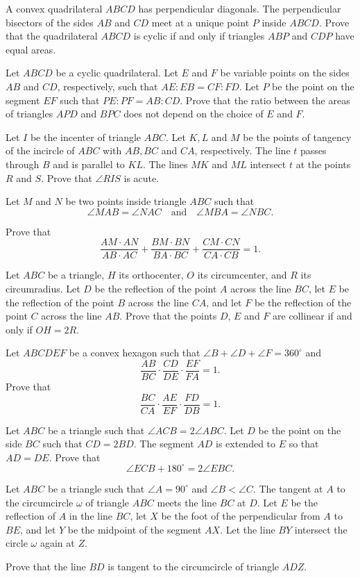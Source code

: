 \item[\textbf{G1.}]A convex quadrilateral $ABCD$ has perpendicular diagonals. The perpendicular bisectors of the sides $AB$ and $CD$ meet at a unique point $P$ inside $ABCD$. Prove that the quadrilateral $ABCD$ is cyclic if and only if triangles $ABP$ and $CDP$ have equal areas.

\item[\textbf{G2.}]Let $ABCD$ be a cyclic quadrilateral. Let $E$ and $F$ be variable points on the sides $AB$ and $CD$,  respectively, such that $AE:EB=CF:FD$. Let $P$ be the point on the segment $EF$ such that $PE:PF=AB:CD$. Prove that the ratio between the areas of triangles $APD$ and $BPC$ does not depend on the choice of $E$ and $F$.

\item[\textbf{G3.}]Let $I$ be the incenter of triangle $ABC$. Let $K,L$ and $M$ be the points of tangency of the incircle of $ABC$ with $AB,BC$ and $CA$,  respectively. The line $t$ passes through $B$ and is parallel to $KL$. The lines $MK$ and $ML$ intersect $t$ at the points $R$ and $S$. Prove that $\angle RIS$ is acute.

\item[\textbf{G4.}]Let $ M$ and $ N$ be two points inside triangle $ ABC$ such that\[ \angle MAB = \angle NAC\quad \mbox{and}\quad \angle MBA = \angle NBC.
\]

Prove that\[ \frac {AM \cdot AN}{AB \cdot AC} + \frac {BM \cdot BN}{BA \cdot BC} + \frac {CM \cdot CN}{CA \cdot CB} = 1.
\]

\item[\textbf{G5.}]Let $ABC$ be a triangle, $H$ its orthocenter, $O$ its circumcenter, and $R$ its circumradius. Let $D$ be the reflection of the point $A$ across the line $BC$,  let $E$ be the reflection of the point $B$ across the line $CA$,  and let $F$ be the reflection of the point $C$ across the line $AB$. Prove that the points $D$,  $E$ and $F$ are collinear if and only if $OH=2R$.

\item[\textbf{G6.}]Let $ABCDEF$ be a convex hexagon such that $\angle B+\angle D+\angle F=360^{\circ }$ and \[ \frac{AB}{BC} \cdot \frac{CD}{DE} \cdot \frac{EF}{FA} = 1.  \] Prove that \[ \frac{BC}{CA} \cdot \frac{AE}{EF} \cdot \frac{FD}{DB} = 1.  \]

\item[\textbf{G7.}]Let $ABC$ be a triangle such that $\angle ACB=2\angle ABC$. Let $D$ be the point on the side $BC$ such that $CD=2BD$. The segment $AD$ is extended to $E$ so that $AD=DE$. Prove that \[ \angle ECB+180^{\circ }=2\angle EBC. \]

\item[\textbf{G8.}]Let $ABC$ be a triangle such that $\angle A=90^{\circ }$ and $\angle B<\angle C$. The tangent at $A$ to the circumcircle $\omega$ of triangle $ABC$ meets the line $BC$ at $D$. Let $E$ be the reflection of $A$ in the line $BC$,  let $X$ be the foot of the perpendicular from $A$ to $BE$,  and let $Y$ be the midpoint of the segment $AX$. Let the line $BY$ intersect the circle $\omega$ again at $Z$.

Prove that the line $BD$ is tangent to the circumcircle of triangle $ADZ$.
